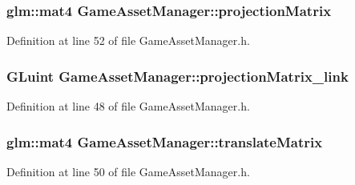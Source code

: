 \hypertarget{class_game_asset_manager_a2bc76e9ac72dcf9490436a59dc3bc752}{}
\subsubsection[{projection\+Matrix}]{\setlength{\rightskip}{0pt plus 5cm}glm\+::mat4 Game\+Asset\+Manager\+::projection\+Matrix\hspace{0.3cm}{\ttfamily [private]}}\label{class_game_asset_manager_a2bc76e9ac72dcf9490436a59dc3bc752}


Definition at line 52 of file Game\+Asset\+Manager.\+h.

\hypertarget{class_game_asset_manager_aa98eb0fb89a0a39e29be33294b322855}{}
\subsubsection[{projection\+Matrix\+\_\+link}]{\setlength{\rightskip}{0pt plus 5cm}G\+Luint Game\+Asset\+Manager\+::projection\+Matrix\+\_\+link\hspace{0.3cm}{\ttfamily [private]}}\label{class_game_asset_manager_aa98eb0fb89a0a39e29be33294b322855}


Definition at line 48 of file Game\+Asset\+Manager.\+h.

\hypertarget{class_game_asset_manager_a1f0530749ec3ca5ee7925b2b70e8a8c2}{}
\subsubsection[{translate\+Matrix}]{\setlength{\rightskip}{0pt plus 5cm}glm\+::mat4 Game\+Asset\+Manager\+::translate\+Matrix\hspace{0.3cm}{\ttfamily [private]}}\label{class_game_asset_manager_a1f0530749ec3ca5ee7925b2b70e8a8c2}


Definition at line 50 of file Game\+Asset\+Manager.\+h.

\hypertarget{class_game_asset_manager_a5e737710573e276ca53c683bc6731a51}{}
